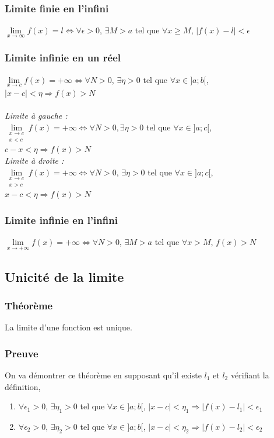 \documentclass[a4paper,10pt]{book} %
\begin{document}
\subsubsection{Limite finie en l'infini}
$\lim\limits_{x\rightarrow \infty} f(x)=l \Leftrightarrow \forall \epsilon>0$, $\exists M>a$ tel que $\forall x\geq M$, $|f(x)-l|<\epsilon$

\subsubsection{Limite infinie en un réel}
$\lim\limits_{x\rightarrow c}f(x)=+\infty \Leftrightarrow \forall N>0$, $\exists \eta>0$ tel que $\forall x\in ]a;b[$, $|x-c|<\eta \Rightarrow f(x)>N$\\\\

\textit{Limite à gauche :}\\
$\lim\limits_{\substack{x\rightarrow c \\ x<c}}f(x)=+\infty \Leftrightarrow \forall N>0, \exists \eta>0$ tel que $\forall x\in ]a;c[$, $c-x<\eta \Rightarrow f(x)>N$\\

\textit{Limite à droite :}\\
$\lim\limits_{\substack{x\rightarrow c \\ x>c}} f(x)=+\infty \Leftrightarrow \forall N>0$, $\exists \eta>0$ tel que $\forall x\in ]a;c[$, $x-c<\eta \Rightarrow f(x)>N$

\subsubsection{Limite infinie en l'infini}
$\lim\limits_{x\rightarrow +\infty} f(x)=+\infty \Leftrightarrow \forall N>0$, $\exists M>a$ tel que $\forall x >M$, $f(x)>N$

\newpage

\subsection{Unicité de la limite}
\subsubsection{Théorème}
La limite d'une fonction est unique.

\subsubsection{Preuve}
On va démontrer ce théorème en supposant qu'il existe $l_{1}$ et $l_{2}$ vérifiant la définition,\begin{enumerate}
\item $\forall \epsilon_{1}>0$, $\exists \eta_{1}>0$ tel que $\forall x\in ]a;b[$, $|x-c|<\eta_{1} \Rightarrow |f(x)-l_{1}| <\epsilon_{1}$
\item $\forall \epsilon_{2}>0$, $\exists \eta_{2}>0$ tel que $\forall x\in ]a;b[$, $|x-c|<\eta_{2} \Rightarrow |f(x)-l_{2}| <\epsilon_{2}$\\ \end{enumerate}
\end{document}
